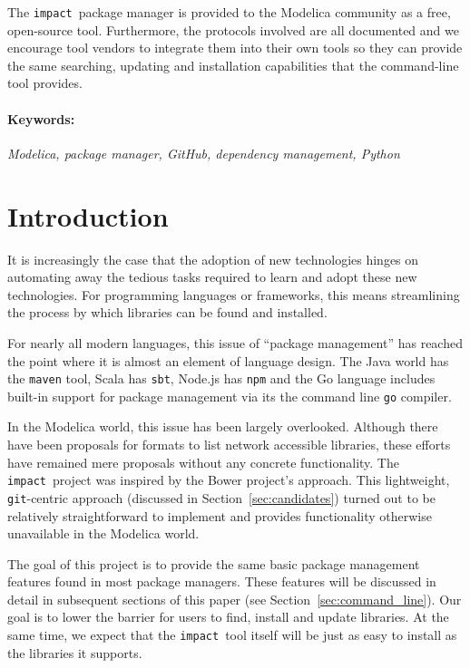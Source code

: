 \documentclass[11pt,a4paper,twocolumn]{article}
\newcommand{\impact}{\texttt{impact}} %
\newcommand{\code}[1]{\texttt{#1}} %
\begin{document}
The \impact\ package manager is provided to the Modelica community as
a free, open-source tool.  Furthermore, the protocols involved are all
documented and we encourage tool vendors to integrate them into their
own tools so they can provide the same searching, updating and
installation capabilities that the command-line tool provides.

\paragraph{Keywords:}
\emph{Modelica, package manager, GitHub, dependency management, Python}

\section{Introduction}
\label{sec:intro}

It is increasingly the case that the adoption of new technologies
hinges on automating away the tedious tasks required to learn and
adopt these new technologies.  For programming languages or
frameworks, this means streamlining the process by which libraries can
be found and installed.

For nearly all modern languages, this issue of ``package management''
has reached the point where it is almost an element of language
design.  The Java world has the \code{maven} tool, Scala has
\code{sbt}, Node.js has \code{npm} and the Go language includes
built-in support for package management via its the command line
\code{go} compiler.

In the Modelica world, this issue has been largely overlooked.
Although there have been proposals for formats to list network
accessible libraries, these efforts have remained mere proposals
without any concrete functionality.  The \impact\ project was inspired
by the Bower\cite{Bower} project's approach.  This lightweight,
\code{git}-centric approach (discussed in
Section~\ref{sec:candidates}) turned out to be relatively
straightforward to implement and provides functionality otherwise
unavailable in the Modelica world.

The goal of this project is to provide the same basic package
management features found in most package managers.  These features
will be discussed in detail in subsequent sections of this paper (see
Section~\ref{sec:command_line}).  Our goal is to lower the barrier for
users to find, install and update libraries.  At the same time, we
expect that the \impact\ tool itself will be just as easy to install
as the libraries it supports.
\end{document}
